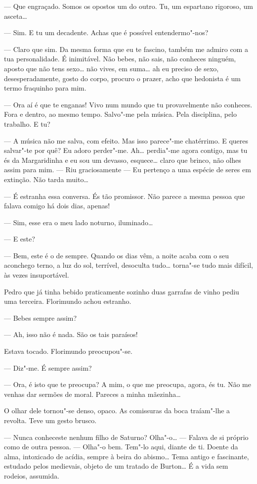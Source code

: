 --- Que engraçado. Somos os opostos um do outro. Tu, um espartano
rigoroso, um asceta\ldots{}

--- Sim. E tu um decadente. Achas que é possível entendermo"-nos?

--- Claro que sim. Da mesma forma que eu te fascino, também me admiro com
a tua personalidade. É inimitável. Não bebes, não sais, não conheces
ninguém, aposto que não tens sexo\ldots{} não vives, em suma\ldots{} ah eu
preciso de sexo, desesperadamente, gosto do corpo, procuro o prazer,
acho que hedonista é um termo fraquinho para mim.

--- Ora aí é que te enganas! Vivo num mundo que tu provavelmente não
conheces. Fora e dentro, ao mesmo tempo. Salvo"-me pela música. Pela
disciplina, pelo trabalho. E tu?

--- A música não me salva, com efeito. Mas isso parece"-me chatérrimo. E
queres salvar"-te por quê? Eu adoro perder"-me. Ah\ldots{} perdia"-me agora
contigo, mas tu és da Margaridinha e eu sou um devasso,
esquece\ldots{} claro que brinco, não olhes assim para mim. ---  Riu
graciosamente --- Eu pertenço a uma espécie de seres em extinção. Não
tarda muito\ldots{}

--- É estranha essa conversa. És tão promissor. Não parece a mesma pessoa
que falava comigo há dois dias, apenas!

--- Sim, esse era o meu lado noturno, iluminado\ldots{}

--- E este?

--- Bem, este é o de sempre. Quando os dias vêm, a noite acaba com o seu
aconchego terno, a luz do sol, terrível, desoculta tudo\ldots{} torna"-se tudo
mais difícil, às vezes insuportável.

Pedro que já tinha bebido praticamente sozinho duas garrafas de vinho
pediu uma terceira. Florimundo achou estranho.

--- Bebes sempre assim?

--- Ah, isso não é nada. São os tais paraísos!

Estava tocado. Florimundo preocupou"-se.

--- Diz"-me. É sempre assim?

--- Ora, é isto que te preocupa? A mim, o que me preocupa, agora, és tu.
Não me venhas dar sermões de moral. Pareces a minha mãezinha\ldots{}

O olhar dele tornou"-se denso, opaco. As comissuras da boca traíam"-lhe a
revolta. Teve um gesto brusco.

--- Nunca conheceste nenhum filho de Saturno? Olha"-o\ldots{} --- Falava de si
próprio como de outra pessoa. --- Olha"-o bem. Tem"-lo aqui, diante de ti.
Doente da alma, intoxicado de acídia, sempre à beira do abismo\ldots{} Tema
antigo e fascinante, estudado pelos medievais, objeto de um tratado de
Burton\ldots{} É a vida sem rodeios, assumida.

